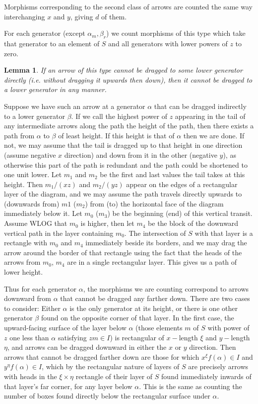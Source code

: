 \documentclass[a4paper,12pt,titlepage]{article}
\newtheorem{lmm}{Lemma}
\begin{document}
Morphisms corresponding to the second class of arrows are counted the same way interchanging $x$ and $y$, giving $d$ of them.

For each generator (except $\alpha_m, \beta_r$) we count morphisms of this type which take that generator to an element of $S$ and all generators with lower powers of $z$ to zero.
\begin{lmm} If an arrow of this type cannot be dragged to some lower generator directly (i.e. without dragging it upwards then down), then it cannot be dragged to a lower generator in any manner.
\end{lmm}
Suppose we have such an arrow at a generator $\alpha$ that can be dragged indirectly to a lower generator $\beta$.
If we call the highest power of $z$ appearing in the tail of any intermediate arrows along the path the height of the path,
then there exists a path from $\alpha$ to $\beta$ of least height. If this height is that of $\alpha$ then we are done.
If not, we may assume that the tail is dragged up to that height in one direction (assume negative $x$ direction) and down from it in the other (negative $y$),
as otherwise this part of the path is redundant and the path could be shortened to one unit lower. Let $m_1$ and $m_2$ be the first and last values the tail takes
at this height. Then $m_1/(xz)$ and $m_2/(yz)$ appear on the edges of a rectangular layer of the diagram, and we may assume the path travels
directly upwards to (downwards from) $m1$ ($m_2$) from (to) the horizontal face of the diagram immediately below it.
Let $m_0$ ($m_3$) be the beginning (end) of this vertical transit. Assume WLOG that $m_0$ is higher, then let $m_4$ be the block of the downward vertical path
in the layer containing $m_0$. The intersection of $S$ with that layer is a rectangle with $m_0$ and $m_4$ immediately beside its borders,
and we may drag the arrow around the border of that rectangle using the fact that the heads of the arrows from $m_0$, $m_4$ are in a single rectangular layer.
This gives us a path of lower height.


Thus for each generator $\alpha$, the morphisms we are counting correspond to arrows downward from $\alpha$ that cannot be dragged any farther down.
There are two cases to consider: Either $\alpha$ is the only generator at its height, or there is one other generator $\beta$ found on the opposite corner of that layer.
In the first case, the upward-facing surface of the layer below $\alpha$ (those elements $m$ of $S$ with power of $z$ one less than $\alpha$ satisfying $zm \in I$)
is rectangular of $x-$length $\xi$ and $y-$length $\eta$, and arrows can be dragged downward in either the $x$ or $y$ direction.
Then arrows that cannot be dragged farther down are those for which $x^{\xi}f(\alpha) \in I$ and $y^\eta f(\alpha) \in I$,
which by the rectangular nature of layers of $S$ are precisely arrows with heads in the $\xi \times \eta$ rectangle of their layer of $S$
found immediately inwards of that layer's far corner, for any layer below $\alpha$. This is the same as counting the number of boxes found
directly below the rectangular surface under $\alpha$.
\end{document}
